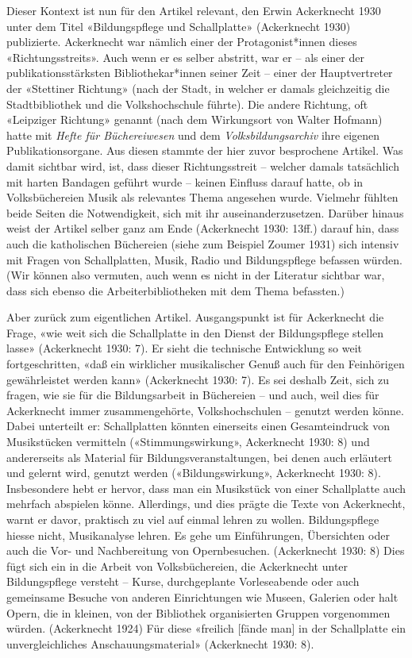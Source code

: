 \documentclass[a4paper,
fontsize=11pt,
oneside,
numbers=noperiodatend,
parskip=half-,
bibliography=totoc,
final
]{scrartcl}
\begin{document}
Dieser Kontext ist nun für den Artikel relevant, den Erwin Ackerknecht
1930 unter dem Titel «Bildungspflege und Schallplatte» (Ackerknecht
1930) publizierte. Ackerknecht war nämlich einer der Protagonist*innen
dieses «Richtungsstreits». Auch wenn er es selber abstritt, war er --
als einer der publikationsstärksten Bibliothekar*innen seiner Zeit --
einer der Hauptvertreter der «Stettiner Richtung» (nach der Stadt, in
welcher er damals gleichzeitig die Stadtbibliothek und die
Volkshochschule führte). Die andere Richtung, oft «Leipziger Richtung»
genannt (nach dem Wirkungsort von Walter Hofmann) hatte mit \emph{Hefte
für Büchereiwesen} und dem \emph{Volksbildungsarchiv} ihre eigenen
Publikationsorgane. Aus diesen stammte der hier zuvor besprochene
Artikel. Was damit sichtbar wird, ist, dass dieser Richtungsstreit --
welcher damals tatsächlich mit harten Bandagen geführt wurde -- keinen
Einfluss darauf hatte, ob in Volksbüchereien Musik als relevantes Thema
angesehen wurde. Vielmehr fühlten beide Seiten die Notwendigkeit, sich
mit ihr auseinanderzusetzen. Darüber hinaus weist der Artikel selber
ganz am Ende (Ackerknecht 1930: 13ff.) darauf hin, dass auch die
katholischen Büchereien (siehe zum Beispiel Zoumer 1931) sich intensiv
mit Fragen von Schallplatten, Musik, Radio und Bildungspflege befassen
würden. (Wir können also vermuten, auch wenn es nicht in der Literatur
sichtbar war, dass sich ebenso die Arbeiterbibliotheken mit dem Thema
befassten.)

Aber zurück zum eigentlichen Artikel. Ausgangspunkt ist für Ackerknecht
die Frage, «wie weit sich die Schallplatte in den Dienst der
Bildungspflege stellen lasse» (Ackerknecht 1930: 7). Er sieht die
technische Entwicklung so weit fortgeschritten, «daß ein wirklicher
musikalischer Genuß auch für den Feinhörigen gewährleistet werden kann»
(Ackerknecht 1930: 7). Es sei deshalb Zeit, sich zu fragen, wie sie für
die Bildungsarbeit in Büchereien -- und auch, weil dies für Ackerknecht
immer zusammengehörte, Volkshochschulen -- genutzt werden könne. Dabei
unterteilt er: Schallplatten könnten einerseits einen Gesamteindruck von
Musikstücken vermitteln («Stimmungswirkung», Ackerknecht 1930: 8) und
andererseits als Material für Bildungsveranstaltungen, bei denen auch
erläutert und gelernt wird, genutzt werden («Bildungswirkung»,
Ackerknecht 1930: 8). Insbesondere hebt er hervor, dass man ein
Musikstück von einer Schallplatte auch mehrfach abspielen könne.
Allerdings, und dies prägte die Texte von Ackerknecht, warnt er davor,
praktisch zu viel auf einmal lehren zu wollen. Bildungspflege hiesse
nicht, Musikanalyse lehren. Es gehe um Einführungen, Übersichten oder
auch die Vor- und Nachbereitung von Opernbesuchen. (Ackerknecht 1930: 8)
Dies fügt sich ein in die Arbeit von Volksbüchereien, die Ackerknecht
unter Bildungspflege versteht -- Kurse, durchgeplante Vorleseabende oder
auch gemeinsame Besuche von anderen Einrichtungen wie Museen, Galerien
oder halt Opern, die in kleinen, von der Bibliothek organisierten
Gruppen vorgenommen würden. (Ackerknecht 1924) Für diese «freilich
{[}fände man{]} in der Schallplatte ein unvergleichliches
Anschauungsmaterial» (Ackerknecht 1930: 8).
\end{document}
